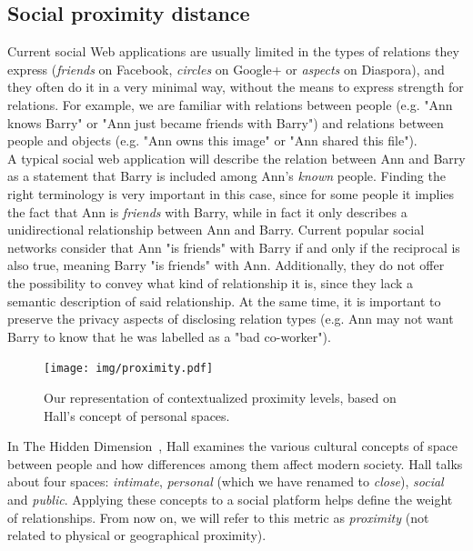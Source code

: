 \subsection{Social proximity distance}
Current social Web applications are usually limited in the types of relations they express (\textit{friends} on Facebook, \textit{circles} on Google+ or \textit{aspects} on Diaspora), and they often do it in a very minimal way, without the means to express strength for relations. For example, we are familiar with relations between people (e.g. "Ann knows Barry" or "Ann just became friends with Barry") and relations between people and objects (e.g. "Ann owns this image" or "Ann shared this file").\\

A typical social web application will describe the relation between Ann and Barry as a statement that Barry is included among Ann's \textit{known} people. Finding the right terminology is very important in this case, since for some people it implies the fact that Ann is \textit{friends} with Barry, while in fact it only describes a unidirectional relationship between Ann and Barry. Current popular social networks consider that Ann "is friends" with Barry if and only if the reciprocal is also true, meaning Barry "is friends" with Ann. Additionally, they do not offer the possibility to convey what kind of relationship it is, since they lack a semantic description of said relationship. At the same time, it is important to preserve the privacy aspects of disclosing relation types (e.g. Ann may not want Barry to know that he was labelled as a "bad co-worker").\\

\begin{figure}[h]
  \begin{center}
    \texttt{[image: img/proximity.pdf]}
        \caption{Our representation of contextualized proximity levels, based on Hall's concept of personal spaces.}
        \label{fig:proximity}
  \end{center}
\end{figure}

In The Hidden Dimension~\cite{edward1966hall}, Hall examines the various cultural concepts of space between people and how differences among them affect modern society. Hall talks about four spaces: \textit{intimate}, \textit{personal} (which we have renamed to \textit{close}), \textit{social} and \textit{public}. Applying these concepts to a social platform helps define the weight of relationships. From now on, we will refer to this metric as \textit{proximity} (not related to physical or geographical proximity).\\

